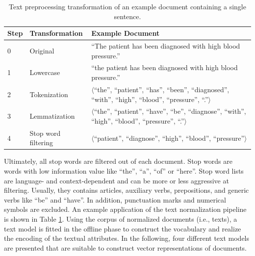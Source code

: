 \begin{table}[!htbp]
	\begin{tabularx}{\textwidth}{l l p{9.8cm}}
		\toprule
		\textbf{Step} & \textbf{Transformation} & \textbf{Example Document}                                                       \\ \midrule
		0             & Original       &   \enquote{The patient has been diagnosed with high blood pressure.} \\
		1             & Lowercase               &   \enquote{the patient has been diagnosed with high blood pressure.} \\
		2 & Tokenization  & $\langle$\enquote{the}, \enquote{patient}, \enquote{has}, \enquote{been}, \enquote{diagnosed}, \enquote{with}, \enquote{high}, \enquote{blood}, \enquote{pressure}, \enquote{.}$\rangle$ \\
		3 & Lemmatization & $\langle$\enquote{the}, \enquote{patient}, \enquote{have},  \enquote{be}, \enquote{diagnose}, \enquote{with},  \enquote{high}, \enquote{blood}, \enquote{pressure}, \enquote{.}$\rangle$  \\
		4             & Stop word filtering     & $\langle$\enquote{patient}, \enquote{diagnose}, \enquote{high}, \enquote{blood}, \enquote{pressure}$\rangle$ \\ \bottomrule
	\end{tabularx}
	\caption[Text preprocessing transformation of an example document]{Text preprocessing transformation of an example document containing a single sentence.}
	\label{tab:text-preprocessing}
\end{table}

Ultimately, all stop words are filtered out of each document.
Stop words are words with low information value like \enquote{the},  \enquote{a},  \enquote{of} or  \enquote{here}.
Stop word lists are language- and context-dependent and can be more or less aggressive at filtering.
Usually, they contains articles, auxiliary verbs, prepositions, and generic verbs like \enquote{be} and \enquote{have}.
In addition, punctuation marks and numerical symbols are excluded.
An example application of the text normalization pipeline is shown in Table \ref{tab:text-preprocessing}.
Using the corpus of normalized documents (i.e., texts), a text model is fitted in the offline phase to construct the vocabulary and realize the encoding of the textual attributes.
In the following, four different text models are presented that are suitable to construct vector representations of documents.

